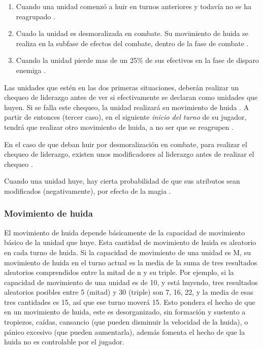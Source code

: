 \begin{enumerate}
\item Cuando una unidad comenzó a huir en turnos anteriores y todavía
  no se ha reagrupado .
\item Cuado la unidad es desmoralizada en combate. Su movimiento de
  huida se realiza en la subfase de efectos del combate, dentro de la
  fase de combate .
\item Cuando la unidad pierde mas de un 25\% de sus efectivos en la
  fase de disparo enemiga .
\end{enumerate}

Las unidades que estén en las dos primeras situaciones, deberán
realizar un chequeo de liderazgo antes de ver si efectivamente se
declaran como unidades que huyen. Si se falla este chequeo, la unidad
realizará su movimiento de huida . A partir
de entonces (tercer caso), en el siguiente \emph{inicio del turno} de su jugador, tendrá que realizar
otro movimiento de huida, a no ser que se reagrupen .

En el caso de que deban huir por desmoralización en combate, para
realizar el chequeo de liderazgo, existen unos modificadores al
liderazgo antes de realizar el chequeo .

Cuando una unidad huye, hay cierta probabilidad de que sus atributos
sean modificados (negativamente), por efecto de la magia .

\subsubsection*{Movimiento de huida}
\label{movimiento de huida}
El movimiento de huida depende básicamente de la capacidad de
movimiento básico de la unidad que huye. Esta cantidad de movimiento
de huida es aleatorio en cada turno de huida. Si la capacidad de
movimiento de una unidad es M, su movimiento de huida en el turno
actual es la media de la suma de tres resultados aleatorios
comprendidos entre la mitad de n y su triple. Por ejemplo, si la
capacidad de movimiento de una unidad es de 10, y está huyendo, tres
resultados aleatorios posibles entre 5 (mitad) y 30 (triple) son 7,
16, 22, y la media de esas tres cantidades es 15, así que ese turno
moverá 15. Esto pondera el hecho de que en un movimiento de huida,
este es desorganizado, sin formación y sustento a tropiezos, caídas,
cansancio (que pueden disminuir la velocidad de la huida), o pánico
excesivo (que pueden aumentarla), además fomenta el hecho de que la
huida no es controlable por el jugador.

